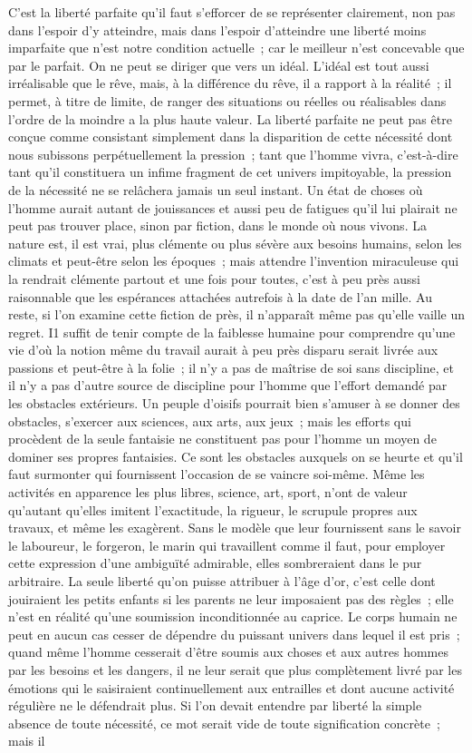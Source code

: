 \documentclass[french,twoside]{book} %
\begin{document}
C'est la liberté parfaite qu'il faut s'efforcer de se représenter clairement, non pas dans l'espoir d'y atteindre, mais dans l'espoir d'atteindre une liberté moins imparfaite que n'est notre condition actuelle ; car le meilleur n'est concevable que par le parfait. On ne peut se diriger que vers un idéal. L'idéal est tout aussi irréalisable que le rêve, mais, à la différence du rêve, il a rapport à la réalité ; il permet, à titre de limite, de ranger des situations ou réelles ou réalisables dans l'ordre de la moindre a la plus haute valeur. La liberté parfaite ne peut pas être conçue comme consistant simplement dans la disparition de cette nécessité dont nous subissons perpétuellement la pression ; tant que l'homme vivra, c'est-à-dire tant qu'il constituera un infime fragment de cet univers impitoyable, la pression de la nécessité ne se relâchera jamais un seul instant. Un état de choses où l'homme aurait autant de jouissances et aussi peu de fatigues qu'il lui plairait ne peut pas trouver place, sinon par fiction, dans le monde où nous vivons. La nature est, il est vrai, plus clémente ou plus sévère aux besoins humains, selon les climats et peut-être selon les époques ; mais attendre l'invention miraculeuse qui la rendrait clémente partout et une fois pour toutes, c'est à peu près aussi raisonnable que les espérances attachées autrefois à la date de l'an mille. Au reste, si l'on examine cette fiction de près, il n'apparaît même pas qu'elle vaille un regret. I1 suffit de tenir compte de la faiblesse humaine pour comprendre qu'une vie d'où la notion même du travail aurait à peu près disparu serait livrée aux passions et peut-être à la folie ; il n'y a pas de maîtrise de soi sans discipline, et il n'y a pas d'autre source de discipline pour l'homme que l'effort demandé par les obstacles extérieurs. Un peuple d'oisifs pourrait bien s'amuser à se donner des obstacles, s'exercer aux sciences, aux arts, aux jeux ; mais les efforts qui procèdent de la seule fantaisie ne constituent pas pour l'homme un moyen de dominer ses propres fantaisies. Ce sont les obstacles auxquels on se heurte et qu'il faut surmonter qui fournissent l'occasion de se vaincre soi-même. Même les activités en apparence les plus libres, science, art, sport, n'ont de valeur qu'autant qu'elles imitent l'exactitude, la rigueur, le scrupule propres aux travaux, et même les exagèrent. Sans le modèle que leur fournissent sans le savoir le laboureur, le forgeron, le marin qui travaillent comme il faut, pour employer cette expression d'une ambiguïté admirable, elles sombreraient dans le pur arbitraire. La seule liberté qu'on puisse attribuer à l’âge d'or, c'est celle dont jouiraient les petits enfants si les parents ne leur imposaient pas des règles ; elle n'est en réalité qu'une soumission inconditionnée au caprice. Le corps humain ne peut en aucun cas cesser de dépendre du puissant univers dans lequel il est pris ; quand même l'homme cesserait d'être soumis aux choses et aux autres hommes par les besoins et les dangers, il ne leur serait que plus complètement livré par les émotions qui le saisiraient continuellement aux entrailles et dont aucune activité régulière ne le défendrait plus. Si l'on devait entendre par liberté la simple absence de toute nécessité, ce mot serait vide de toute signification concrète ; mais il 
\end{document}
